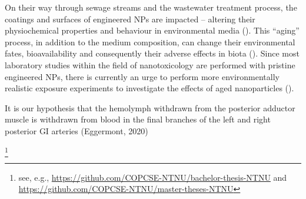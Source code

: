 On their way through sewage streams and the wastewater treatment process, the coatings and surfaces of engineered NPs are impacted – altering their physiochemical properties and behaviour in environmental media (\cite{Kaegi2013}). This “aging” process, in addition to the medium composition, can change their environmental fates, bioavailability and consequently their adverse effects in biota (\cite{Metreveli2016, Georgantzopoulou2020}). Since most laboratory studies within the field of nanotoxicology are performed with pristine engineered NPs, there is currently an urge to perform more environmentally realistic exposure experiments to investigate the effects of aged nanoparticles (\cite{Metreveli2016}).



It is our hypothesis that the hemolymph withdrawn from the posterior adductor muscle is withdrawn from blood in the final branches of the left and right posterior GI arteries (Eggermont, 2020)








\footnote{see, e.g., 
\url{https://github.com/COPCSE-NTNU/bachelor-thesis-NTNU} and \url{https://github.com/COPCSE-NTNU/master-theses-NTNU}}
